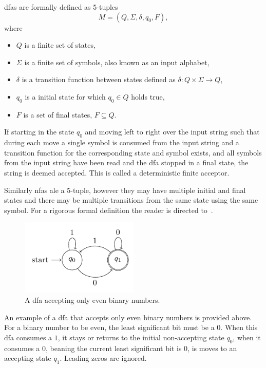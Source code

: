 \begin{definition}\label{def:dfa}
\glspl{dfa} are formally defined as 5-tuples
$$ M = (Q, \Sigma, \delta, q_0, F),$$ 
where
\begin{itemize}
\item $Q$ is a finite set of states,
\item $\Sigma$ is a finite set of symbols, also known as an input alphabet,
\item $\delta$ is a transition function between states defined as $\delta : Q \times \Sigma \rightarrow Q$,
\item $q_0$ is a initial state for which $q_0 \in Q$ holds true,
\item $F$ is a set of final states, $F \subseteq Q$.
\end{itemize}


If starting in the state $q_0$ and moving left to right over the input string such that during each move a single symbol is consumed from the input string and a transition function for the corresponding state and symbol exists, and all symbols from the input string have been read and the \gls{dfa} stopped in a final state, the string is deemed accepted. This is called a deterministic finite acceptor.
\end{definition}

Similarly \glspl{nfa} ale a 5-tuple, however they may have multiple initial and final states and there may be multiple transitions from the same state using the same symbol. For a rigorous formal definition the reader is directed to~\cite[Chapter~1.4]{Salomaa1987Formal}.

\begin{figure}[H]\label{fig:dfa}
  \centering
  \includegraphics[width=0.5\textwidth]{figures/dfa.pdf}
  \caption{A \gls{dfa} accepting only even binary numbers.}
\end{figure}

An example of a \gls{dfa} that accepts only even binary numbers is provided above. For a binary number to be even, the least significant bit must be a $0$. When this \gls{dfa} consumes a $1$, it stays or returns to the initial non-accepting state $q_0$, when it consumes a $0$, beaning the current least significant bit is $0$, is moves to an accepting state $q_1$. Leading zeros are ignored.





